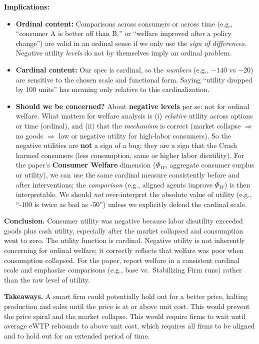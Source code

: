 \documentclass{article}
\begin{document}
\textbf{Implications:}
\begin{itemize}
    \item \textbf{Ordinal content:} Comparisons across consumers or across time (e.g., ``consumer A is better off than B,'' or ``welfare improved after a policy change'') are valid in an ordinal sense if we only use the \emph{sign of differences}. Negative utility \emph{levels} do not by themselves imply an ordinal problem.
    \item \textbf{Cardinal content:} Our spec is cardinal, so the \emph{numbers} (e.g., \(-140\) vs \(-20\)) are sensitive to the chosen scale and functional form. Saying ``utility dropped by 100 units'' has meaning only relative to this cardinalization.
    \item \textbf{Should we be concerned?} About \textbf{negative levels} per se: not for ordinal welfare. What matters for welfare analysis is (i) \emph{relative} utility across options or time (ordinal), and (ii) that the \emph{mechanism} is correct (market collapse \(\Rightarrow\) no goods \(\Rightarrow\) low or negative utility for high-labor consumers). So the negative utilities are \textbf{not} a sign of a bug; they are a sign that the Crash harmed consumers (less consumption, same or higher labor disutility). For the paper’s \textbf{Consumer Welfare} dimension (\(\Phi_W\), aggregate consumer surplus or utility), we can use the same cardinal measure consistently before and after interventions; the \emph{comparison} (e.g., aligned agents improve \(\Phi_W\)) is then interpretable. We should \emph{not} over-interpret the absolute value of utility (e.g., ``-100 is twice as bad as -50'') unless we explicitly defend the cardinal scale.
\end{itemize}

\textbf{Conclusion.} Consumer utility was negative because labor disutility exceeded goods plus cash utility, especially after the market collapsed and consumption went to zero. The utility function is cardinal. Negative utility is not inherently concerning for ordinal welfare; it correctly reflects that welfare was poor when consumption collapsed. For the paper, report welfare in a consistent cardinal scale and emphasize comparisons (e.g., base vs.\ Stabilizing Firm runs) rather than the raw level of utility.

\textbf{Takeaways.} A smart firm could potentially hold out for a better price, halting production and sales until the price is at or above unit cost. This would prevent the price spiral and the market collapse. This would require firms to wait until average eWTP rebounds to above unit cost, which requires all firms to be aligned and to hold out for an extended period of time.
\end{document}
